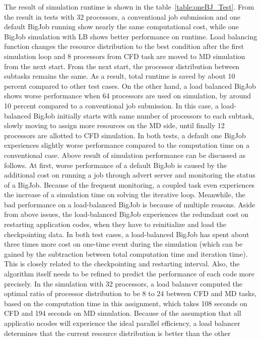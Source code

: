 \documentclass[conference,final]{IEEEtran}
\begin{document}
The result of simulation runtime is shown in the
table~\ref{table:oneBJ_Test}. From the result in tests with 32
processors, a conventional job submission and one default BigJob
running show nearly the same computational cost, while one BigJob
simulation with LB shows better performance on runtime. Load balancing
function changes the resource distribution to the best condition after
the first simulation loop and 8 processors from CFD task are moved to
MD simulation from the next start. From the next start, the processor
distribution between subtasks remains the same. As a result, total
runtime is saved by about 10 percent compared to other test cases. On
the other hand, a load balanced BigJob shows worse performance when 64
processors are used on simulation, by around 10 percent compared to a
conventional job submission. In this case, a load-balanced BigJob
initially starts with same number of processors to each subtask,
slowly moving to assign more resources on the MD side, until finally
12 processors are allotted to CFD simulation. In both tests, a default
one BigJob experiences slightly worse performance compared to the
computation time on a conventional case.  Above result of simulation
performance can be discussed as follows. At first, worse performance
of a default BigJob is caused by the additional cost on running a job
through advert server and monitoring the status of a BigJob. Because
of the frequent monitoring, a coupled task even experiences the
increase of a simulation time on solving the iterative
loop. Meanwhile, the bad performance on a load-balanced BigJob is
because of multiple reasons. Aside from above issues, the
load-balanced BigJob experiences the redundant cost on restarting
application codes, when they have to reinitialize and load the
checkpointing data. In both test cases, a load-balanced BigJob has
spent about three times more cost on one-time event during the
simulation (which can be gained by the subtraction between total
computation time and iteration time). This is closely related to the
checkpointing and restarting interval. Also, the algorithm itself
needs to be refined to predict the performance of each code more
precisely. In the simulation with 32 processors, a load balancer
computed the optimal ratio of processor distribution to be 8 to 24
between CFD and MD tasks, based on the computation time in this
assignment, which takes 108 seconds on CFD and 194 seconds on MD
simulation. Because of the assumption that all applicatio ncodes will
experience the ideal parallel efficiency, a load balancer determines
that the current resource distribution is better than the other
\end{document}
